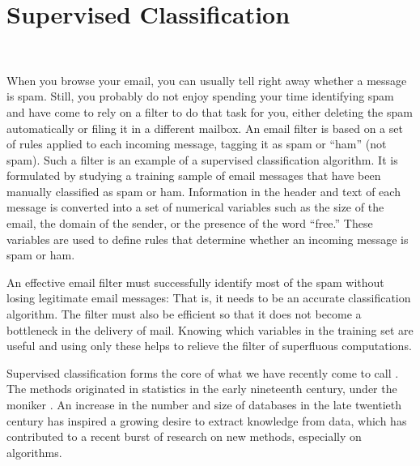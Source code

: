 
\chapter{Supervised Classification}~\label{chap:class}








When you browse your email, you can usually tell right away whether a
message is spam.  Still, you probably do not enjoy spending your
time identifying spam and have come to rely on a filter to do that
task for you, either deleting the spam automatically or filing it in
a different mailbox.  An email filter is based on a set of rules
applied to each incoming message, tagging it as spam or ``ham'' (not
spam). Such a filter is an example of a supervised classification
algorithm. It is formulated by studying a training sample of email
messages that have been manually classified as spam or
ham. Information in the header and text of each message is converted
into a set of numerical variables such as the size of the email, the
domain of the sender, or the presence of the word ``free.'' These
variables are used to define rules that determine whether an incoming
message is spam or ham.

An effective email filter must successfully identify most of the spam
without losing legitimate email messages: That is, it needs to be an
accurate classification algorithm.  The filter must also be efficient
so that it does not become a bottleneck in the delivery of mail.
Knowing which variables in the training set are useful and using only
these helps to relieve the filter of superfluous computations.

Supervised classification forms the core of what we have recently come
to call . The methods originated in statistics in
the early nineteenth century, under the moniker . An increase in the number and size of databases in the late
twentieth century has inspired a growing desire to extract knowledge
from data, which has contributed to a recent burst of research on new
methods, especially on algorithms.


